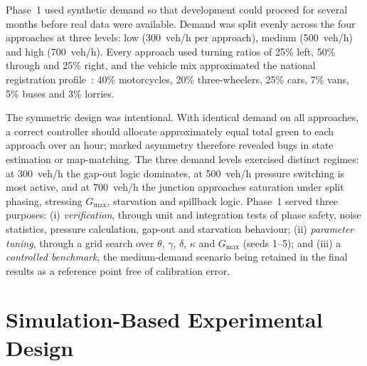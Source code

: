 Phase~1 used synthetic demand so that development could proceed for several months before real data were available. Demand was split evenly across the four approaches at three levels: low (300~veh/h per approach), medium (500~veh/h) and high (700~veh/h). Every approach used turning ratios of 25\% left, 50\% through and 25\% right, and the vehicle mix approximated the national registration profile~\cite{dmt_stats}: 40\% motorcycles, 20\% three-wheelers, 25\% cars, 7\% vans, 5\% buses and 3\% lorries.

The symmetric design was intentional. With identical demand on all approaches, a correct controller should allocate approximately equal total green to each approach over an hour; marked asymmetry therefore revealed bugs in state estimation or map-matching. The three demand levels exercised distinct regimes: at 300~veh/h the gap-out logic dominates, at 500~veh/h pressure switching is most active, and at 700~veh/h the junction approaches saturation under split phasing, stressing $G_{\max}$, starvation and spillback logic. Phase~1 served three purposes: (i) \emph{verification}, through unit and integration tests of phase safety, \vls{} noise statistics, pressure calculation, gap-out and starvation behaviour; (ii) \emph{parameter tuning}, through a grid search over $\theta$, $\gamma$, $\delta$, $\kappa$ and $G_{\max}$ (seeds 1--5); and (iii) a \emph{controlled benchmark}, the medium-demand scenario being retained in the final results as a reference point free of calibration error.

\section{Simulation-Based Experimental Design}\label{sec:method-experiments}

